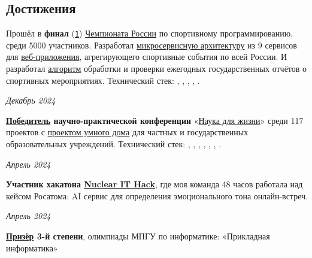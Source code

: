 \documentclass[margin,line]{resume}
\begin{document}
\begin{resume}
  \section{\mysidestyle Достижения}
  Прошёл в
  \textbf{финал}
  (\href{https://alchemmist.github.io/CV/attachments/russian-chemp-final.pdf}{\texttt{1}})
  \href{https://events.fsp-russia.com/championship}{Чемпионата
  России} по спортивному
  программированию, среди 5000 участников. Разработал
  \href{https://alchemmist.github.io/CV/attachments/architect.pdf}{микросервисную
  архитектуру} из 9 сервисов для
  \href{https://github.com/alchemmist/sportprog}{веб-приложения},
  агрегирующего спортивные события по
  всей России. И разработал
  \href{https://github.com/alchemmist/sport-afisha/blob/main/event_parsing_service/parse_pdf.py}{алгоритм}
  обработки и проверки ежегодных
  государственных
  отчётов о спортивных мероприятиях. Технический стек:
  , ,
  ,
  ,
  .

  \vspace{-6mm}

  \hfill \textsl{Декабрь 2024}

  \textbf{\href{https://alchemmist.github.io/CV/attachments/scince-for-life-win.pdf}{Победитель}
  научно-практической конференции}
  «\href{https://conf.profil.mos.ru/academ}{Наука для
  жизни}» среди 117 проектов с
  \href{https://github.com/smart-cab/}{проектом умного
  дома} для частных и государственных
  образовательных учреждений. Технический стек: ,
  , , ,
  , , .
  \vspace{-6mm}

  \hfill \textsl{Апрель 2024}

  \vspace{-2mm}
  \textbf{Участник хакатона \href{https://nuclearhack.mephi.ru/}{Nuclear
  IT Hack}}, где моя команда 48 часов работала
  над кейсом Росатома: AI сервис для определения эмоционального тона
  онлайн-встреч.

  \vspace{-7mm}

  \hfill \textsl{Апрель 2024}

  \textbf{\href{https://alchemmist.github.io/CV/attachments/informatics-olimpic.pdf}{Призёр}
  3-й степени}, олимпиады МПГУ по информатике:
  «Прикладная информатика»
  \vspace{-2mm}


\end{resume}
\end{document}
